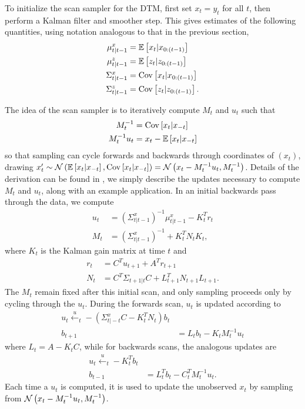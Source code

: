 \documentclass[14pt]{extarticle}
\begin{document}
To initialize the scan sampler for the DTM, first set $x_t = y_t$ for all $t$,
then perform a Kalman filter and smoother step. This gives estimates of the
following quantities, using notation analogous to that in the previous section,
\begin{align*}
  \mu_{t \vert t - 1}^{x} &= \mathbb{E}\left[{x_t \vert x_{0:\left(t - 1\right)}}\right] \\
  \mu_{t \vert t - 1}^{z} &= \mathbb{E}\left[{z_t \vert z_{0:\left(t - 1\right)}}\right] \\
  \Sigma_{t \vert t - 1}^{x} &= \mathrm{Cov}\left[{x_t \vert x_{0:\left(t - 1\right)}}\right] \\
  \Sigma_{t \vert t - 1}^{z} &= \mathrm{Cov}\left[{z_t \vert z_{0 : \left(t - 1\right)}}\right].
\end{align*}

The idea of the scan sampler is to iteratively compute $M_t$ and $u_t$ such that
\begin{align*}
  M_t^{-1} &= \mathrm{Cov}\left[{x_t \vert x_{-t}}\right] \\
  M_t^{-1}u_t &= x_t - \mathbb{E}\left[{x_t \vert x_{-t}}\right]
\end{align*}
so that sampling can cycle forwards and backwards through coordinates of
$\left(x_t\right)$, drawing $x_t^{\prime} \sim \mathcal{N}\left(\mathbb{E}\left[{x_t \vert
  x_{-t}}\right], \mathrm{Cov}\left[{x_t \vert x_{-t}}\right]\right) = \mathcal{N}\left(x_t - M_t^{-1}u_t,
M_t^{-1}\right)$. Details of the derivation can be found in \citep{de1997scan},
we simply describe the updates necessary to compute $M_t$ and $u_t$, along with
an example application. In an initial backwards pass through the data, we
compute
\begin{align*}
  u_t &= \left(\Sigma_{t \vert t - 1}^{x}\right)^{-1}\mu_{t \vert t - 1}^{x} - K_t^{T}r_t \\
  M_t &= \left(\Sigma_{t \vert t - 1}^{x}\right)^{-1} + K_t^{T} N_t K_t,
\end{align*}
where $K_t$ is the Kalman gain matrix at time $t$ and
\begin{align*}
  r_t &= C^T u_{t + 1} + A^{T}r_{t + 1} \\
  N_t &= C^{T} \Sigma_{t + 1 \vert t}C + L_{t + 1}^{T}N_{t + 1}L_{t + 1}.
\end{align*}
The $M_t$ remain fixed after this initial scan, and only sampling proceeds only
by cycling through the $u_t$. During the forwards scan, $u_t$ is updated
according to
\begin{align*}
  u_t \xleftarrow u_t - \left(\Sigma_{t \vert -t}^{x} C - K_t^{T}N_t\right) b_t \\
  b_{t + 1} &= L_{t} b_t - K_t M_t^{-1}u_t
\end{align*}
where $L_t = A - K_t C$, while for backwards scans, the analogous updates are
\begin{align*}
  u_t \xleftarrow u_t - K_t^{T} b_t \\
  b_{t - 1} &= L_t^T b_t - C_t^{T}M_t^{-1}u_t.
\end{align*}
Each time a $u_t$ is computed, it is used to update the unobserved $x_t$ by
sampling from $\mathcal{N}\left(x_t - M_t^{-1}u_t, M_t^{-1}\right)$.
\end{document}

